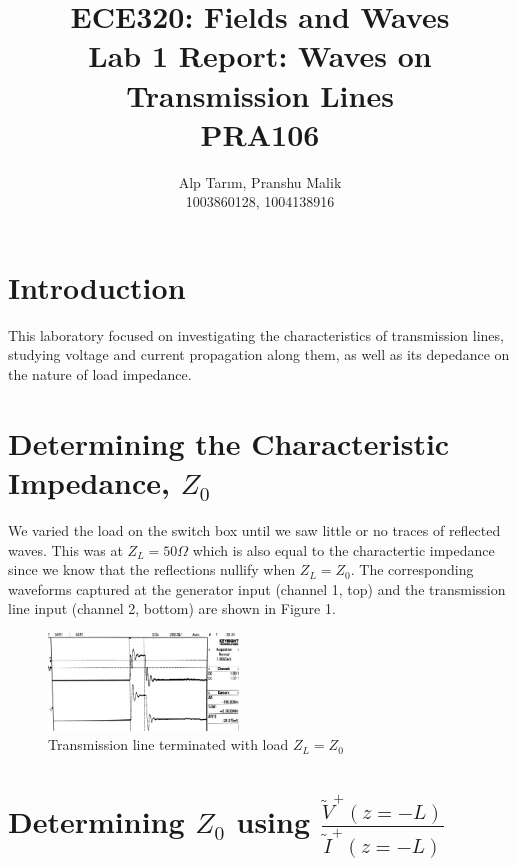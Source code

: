 \documentclass[10pt]{article}
\date{}
\begin{document}
\title{\textbf{\Large{\textsc{ECE320:} Fields and Waves}} \\ \Large{Lab 1 Report: Waves on Transmission Lines} \\ \textbf{\small{PRA106}}\vspace{-0.3cm}}
\author{Alp Tarım, Pranshu Malik \\ \footnotesize{1003860128}, \footnotesize{1004138916}}

\maketitle

\section{Introduction}

This laboratory focused on investigating the characteristics of transmission lines, studying voltage and current 
propagation along them, as well as its depedance on the nature of load impedance.

\section[Determining the Characteristic Impedance, Z0]{Determining the Characteristic Impedance, {$Z_0$}}

We varied the load on the switch box until we saw little or no traces of reflected waves.
This was at $Z_L = 50 \Omega$ which is also equal to the charactertic impedance 
since we know that the reflections nullify when $Z_L = Z_0$. The corresponding waveforms
captured at the generator input (channel 1, top) and the transmission line input (channel 2, bottom) 
are shown in Figure 1.

\begin{figure}[h]
    \centering
    \includegraphics[width=0.45\textwidth]{../photos/lab1/load_matched.jpg}
    \caption{Transmission line terminated with load $Z_L = Z_0$\vspace{-0.5cm}}
    \label{tline_matching_z_0}
\end{figure}

\section[Determining Z0 using V/I]{Determining $Z_0$ using $\frac{\tilde V^+(z=-L)}{\tilde I^+(z=-L)}$}
\end{document}
